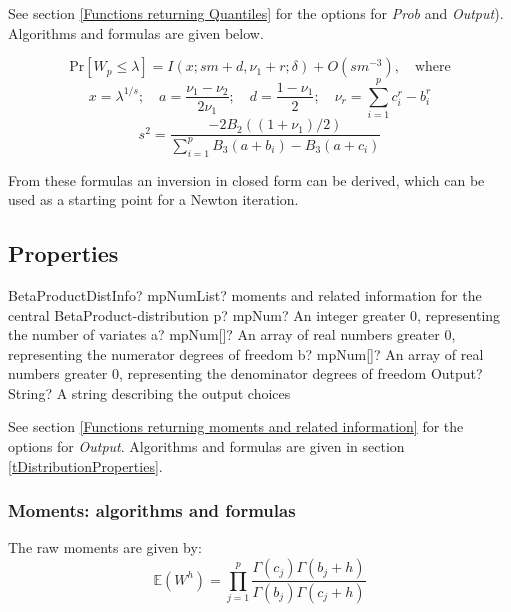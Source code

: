 See section \ref{Functions returning Quantiles} for the options for  {\itshape\sffamily Prob} and {\itshape\sffamily Output}). Algorithms and formulas are given below.

\begin{equation}
	\text{Pr}[W_p \leq \lambda] =  I(x; sm + d, \nu_1 + r; \delta) + O(sm^{-3}), \quad \text{where}
\end{equation}
\begin{equation}
	x=\lambda^{1/s}; \quad a=\frac{\nu_1 - \nu_2}{2\nu_1}; \quad d=\frac{1-\nu_1}{2};  \quad \nu_r=\sum_{i=1}^p{c_i^r - b_i^r}
\end{equation}
\begin{equation}
	s^2 = \frac{-2B_2((1+\nu_1)/2)}{\sum_{i=1}^p{B_3(a+b_i) - B_3(a+c_i) }}
\end{equation}

From these formulas an inversion in closed form can be derived, which can be used as a starting point for a Newton iteration.



\subsection{Properties}
\label{BetaProductDistributionDistributionProperties}


\begin{mpFunctionsExtract}
	\mpFunctionFourNotImplemented
	{BetaProductDistInfo? mpNumList? moments and related information for the central BetaProduct-distribution}
	{p? mpNum? An integer greater 0, representing the number of variates}
	{a? mpNum[]? An array of real numbers greater 0, representing the numerator  degrees of freedom}
	{b? mpNum[]? An array of real numbers greater 0, representing the denominator degrees of freedom}
	{Output? String? A string describing the output choices}
\end{mpFunctionsExtract}

\vspace{0.3cm}

See section \ref{Functions returning moments and related information} for the options for {\itshape\sffamily Output}. Algorithms and formulas are given in section \ref{tDistributionProperties}.

\subsubsection{Moments: algorithms and formulas}
The raw moments are given by:
\begin{equation}
	\mathbb{E}(W^h) = \prod_{j=1}^p \frac{\Gamma(c_j)\Gamma(b_j +h)}{\Gamma(b_j)\Gamma(c_j+h)}
\end{equation}







